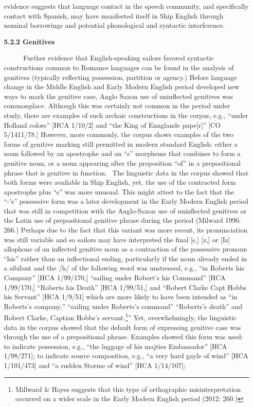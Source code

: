 \begin{styleStandard}
evidence suggests that language contact in the speech community, and specifically contact with Spanish, may have manifested itself in Ship English through nominal borrowings and potential phonological and syntactic interference. ~
\end{styleStandard}


\begin{styleStandard}
\textbf{5.2.2 Genitives}
\end{styleStandard}


\begin{styleStandard}
~~~ \ \ Further evidence that English-speaking sailors favored syntactic constructions common to Romance languages can be found in the analysis of genitives (typically reflecting possession, partition or agency.) Before language change in the Middle English and Early Modern English period developed new ways to mark the genitive case, Anglo Saxon use of uninflected genitives was commonplace. Although this was certainly not common in the period under study, there are examples of such archaic constructions in the corpus, e.g., “under Holland colors” [HCA 1/10/2] and “the King of Ennglande pape[r]” [CO 5/1411/78.] However, more commonly, the corpus shows examples of the two forms of genitive marking still permitted in modern standard English: either a noun followed by an apostrophe and an “s” morpheme that combines to form a genitive noun, or a noun appearing after the preposition “of” in a prepositional phrase that is genitive in function. ~The linguistic data in the corpus showed that both forms were available in Ship English, yet, the use of the contracted form apostrophe plus “s” was more unusual. This might attest to the fact that the “-’s” possessive form was a later development in the Early Modern English period that was still in competition with the Anglo-Saxon use of uninflected genitives or the Latin use of prepositional genitive phrase during the period (Milward 1996: 266.) Perhaps due to the fact that this variant was more recent, its pronunciation was still variable and so sailors may have interpreted the final [s,] [z,] or [Iz] allophone of an inflected genitive noun as a contraction of the possessive pronoun “his” rather than an inflectional ending, particularly if the noun already ended in a sibilant and the /h/ of the following word was unstressed, e.g., “in Roberts his Company” [HCA 1/99/170,] “sailing under Robert’s his Command” [HCA 1/99/170,] “Roberts his Death” [HCA 1/99/51,] and “Robert Clarke Capt Hobbs his Servant” [HCA 1/9/51] which are more likely to have been intended as “in Roberts’s company,” “sailing under Roberts’s command” “Roberts’s death” and Robert Clarke, Captian Hobbs’s servant.\footnote{ Millward \& Hayes suggests that this type of orthographic misinterpretation occurred on a wider scale in the Early Modern English period (2012: 260.)}” Yet, overwhelmingly, the linguistic data in the corpus showed that the default form of expressing genitive case was through the use of a prepositional phrase. Examples showed this form was used: to indicate possession, e.g., “the luggage of his majties Embassador” [HCA 1/98/271]; to indicate source composition, e.g., “a very hard gayle of wind” [HCA 1/101/473] and “a sudden Storme of wind” [HCA 1/14/107]; 
\end{styleStandard}
